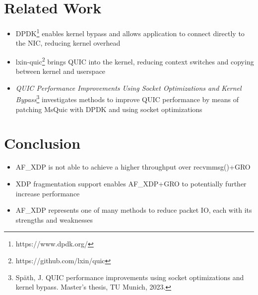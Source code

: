 \section{Related Work}
\begin{frame}
    \begin{itemize}
        \item DPDK\footnote{https://www.dpdk.org/}\nocite{dpdk} enables kernel bypass and allows application to connect directly to the NIC, reducing kernel overhead
        \item lxin-quic\footnote{https://github.com/lxin/quic}\nocite{lxin_quic} brings QUIC into the kernel, reducing context switches and copying between kernel and userspace
        \item \textit{QUIC Performance Improvements Using Socket Optimizations and Kernel Bypass}\footnote{Späth, J. QUIC performance improvements using socket optimizations and kernel bypass. Master’s thesis, TU Munich, 2023.}\nocite{spaeth2023} investigates methods to improve QUIC performance by means
        of patching MsQuic with DPDK and using socket optimizations
    \end{itemize}
\end{frame}

\section{Conclusion}
\begin{frame}
    \begin{itemize}
        \item AF\_XDP is not able to achieve a higher throughput over recvmmsg()+GRO
        \item XDP fragmentation support enables AF\_XDP+GRO to potentially further increase performance
        \item AF\_XDP represents one of many methods to reduce packet IO, each with its strengths and weaknesses
    \end{itemize}
\end{frame}

